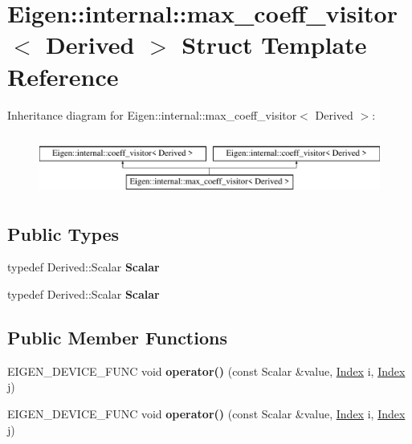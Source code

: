 \hypertarget{struct_eigen_1_1internal_1_1max__coeff__visitor}{}\section{Eigen\+:\+:internal\+:\+:max\+\_\+coeff\+\_\+visitor$<$ Derived $>$ Struct Template Reference}
\label{struct_eigen_1_1internal_1_1max__coeff__visitor}
Inheritance diagram for Eigen\+:\+:internal\+:\+:max\+\_\+coeff\+\_\+visitor$<$ Derived $>$\+:\begin{figure}[H]
\begin{center}
\leavevmode
\includegraphics[height=2.000000cm]{struct_eigen_1_1internal_1_1max__coeff__visitor}
\end{center}
\end{figure}
\subsection*{Public Types}
\begin{DoxyCompactItemize}
\item 
\mbox{\label{struct_eigen_1_1internal_1_1max__coeff__visitor_af0f55c945c93a4c9a8423c9c4d9b24cb}} 
typedef Derived\+::\+Scalar {\bfseries Scalar}
\item 
\mbox{\label{struct_eigen_1_1internal_1_1max__coeff__visitor_af0f55c945c93a4c9a8423c9c4d9b24cb}} 
typedef Derived\+::\+Scalar {\bfseries Scalar}
\end{DoxyCompactItemize}
\subsection*{Public Member Functions}
\begin{DoxyCompactItemize}
\item 
\mbox{\label{struct_eigen_1_1internal_1_1max__coeff__visitor_ad124641f1e34ea2159567e070457f751}} 
E\+I\+G\+E\+N\+\_\+\+D\+E\+V\+I\+C\+E\+\_\+\+F\+U\+NC void {\bfseries operator()} (const Scalar \&value, \hyperlink{namespace_eigen_a62e77e0933482dafde8fe197d9a2cfde}{Index} i, \hyperlink{namespace_eigen_a62e77e0933482dafde8fe197d9a2cfde}{Index} j)
\item 
\mbox{\label{struct_eigen_1_1internal_1_1max__coeff__visitor_ad124641f1e34ea2159567e070457f751}} 
E\+I\+G\+E\+N\+\_\+\+D\+E\+V\+I\+C\+E\+\_\+\+F\+U\+NC void {\bfseries operator()} (const Scalar \&value, \hyperlink{namespace_eigen_a62e77e0933482dafde8fe197d9a2cfde}{Index} i, \hyperlink{namespace_eigen_a62e77e0933482dafde8fe197d9a2cfde}{Index} j)
\end{DoxyCompactItemize}
